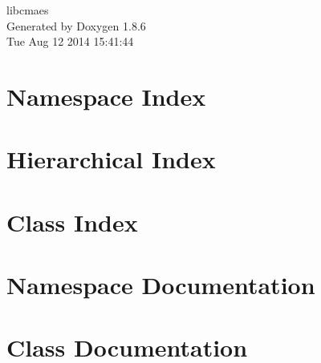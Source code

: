 \documentclass[twoside]{book}
\newcommand{\clearemptydoublepage}{%
  \newpage{\pagestyle{empty}\cleardoublepage}%
}
\begin{document}
\hypersetup{pageanchor=false}
\begin{titlepage}
\vspace*{7cm}
\begin{center}%
{\Large libcmaes }\\
\vspace*{1cm}
{\large Generated by Doxygen 1.8.6}\\
\vspace*{0.5cm}
{\small Tue Aug 12 2014 15:41:44}\\
\end{center}
\end{titlepage}
\clearemptydoublepage
\tableofcontents
\clearemptydoublepage
{}
\hypersetup{pageanchor=true}

\chapter{Namespace Index}

\chapter{Hierarchical Index}

\chapter{Class Index}

\chapter{Namespace Documentation}


\chapter{Class Documentation}






















\newpage
{}
{}
\printindex
\end{document}
